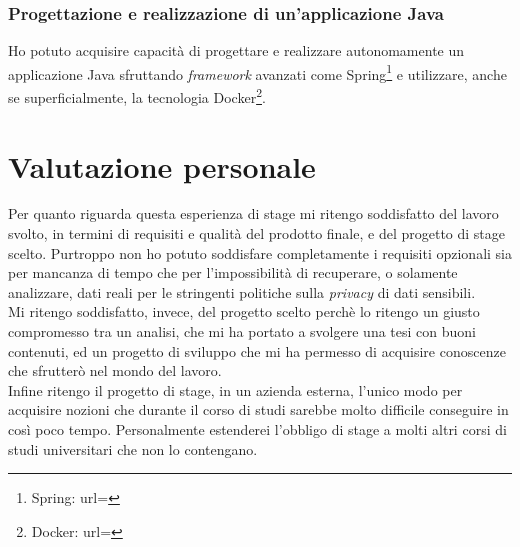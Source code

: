 \subsubsection{Progettazione e realizzazione di un'applicazione Java}
Ho potuto acquisire capacità di progettare e realizzare autonomamente un applicazione Java sfruttando \textit{\gls{framework}} avanzati come Spring\footnote{Spring: url= } e utilizzare, anche se superficialmente, la tecnologia Docker\footnote{Docker: url= }.
\section{Valutazione personale}
Per quanto riguarda questa esperienza di stage mi ritengo soddisfatto del lavoro svolto, in termini di requisiti e qualità del prodotto finale, e del progetto di stage scelto. Purtroppo non ho potuto soddisfare completamente i requisiti opzionali sia per mancanza di tempo che per l'impossibilità di recuperare, o solamente analizzare, dati reali per le stringenti politiche sulla \textit{privacy} di dati sensibili.\\
Mi ritengo soddisfatto, invece, del progetto scelto perchè lo ritengo un giusto compromesso tra un analisi, che mi ha portato a svolgere una tesi con buoni contenuti, ed un progetto di sviluppo che mi ha permesso di acquisire conoscenze che sfrutterò nel mondo del lavoro.\\
Infine ritengo il progetto di stage, in un azienda esterna, l'unico modo per acquisire nozioni che durante il corso di studi sarebbe molto difficile conseguire in così poco tempo. Personalmente estenderei l'obbligo di stage a molti altri corsi di studi universitari che non lo contengano.

